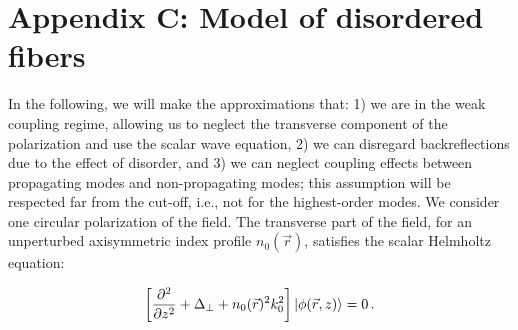 \documentclass[aps,prl,twocolumn, amsmath,amssymb,superscriptaddress]{revtex4-2}
\DeclarePairedDelimiter\ket{\lvert}{\rangle}
\begin{document}
\section*{Appendix C: Model of disordered fibers}

In the following, we will make the approximations that:
1) we are in the weak coupling regime, 
allowing us to neglect the transverse component of the polarization and use the scalar wave equation,
2) we can disregard backreflections due to the effect of disorder,
and 
3) we can neglect coupling effects between propagating modes and non-propagating modes; 
this assumption will be respected far from the cut-off, i.e., not for the highest-order modes.
We consider one circular polarization of the field. 
The transverse part of the field, for an unperturbed axisymmetric index profile $n_0(\vec{r})$, 
satisfies the scalar Helmholtz equation:


\begin{equation}
    \left[ \frac{\partial^2}{\partial z^2} + \Delta_\perp + n_0(\vec{r})^2 k_0^2\right] \ket{\phi(\vec{r}, z)} = 0 \, .
    \label{eq:Helmholtz}
\end{equation}



\end{document}
